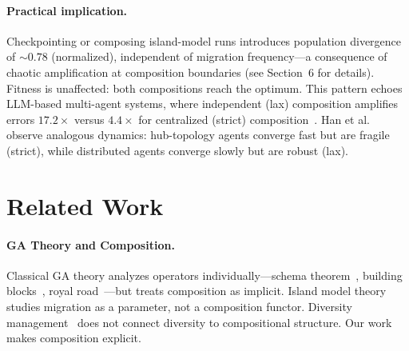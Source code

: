 \documentclass[sigconf]{acmart}
\begin{document}
\paragraph{Practical implication.}
Checkpointing or composing island-model runs introduces population divergence of ${\sim}0.78$ (normalized), independent of migration frequency---a consequence of chaotic amplification at composition boundaries (see Section~6 for details). Fitness is unaffected: both compositions reach the optimum. This pattern echoes LLM-based multi-agent systems, where independent (lax) composition amplifies errors $17.2\times$ versus $4.4\times$ for centralized (strict) composition~\cite{kim2025scaling}. Han et al.~\cite{han2026conformity} observe analogous dynamics: hub-topology agents converge fast but are fragile (strict), while distributed agents converge slowly but are robust (lax).

\section{Related Work}

\paragraph{GA Theory and Composition.}
Classical GA theory analyzes operators individually---schema theorem~\cite{holland1975adaptation}, building blocks~\cite{goldberg1989genetic, goldberg2002design}, royal road~\cite{mitchell1992royal}---but treats composition as implicit. Island model theory~\cite{whitley1999island, skolicki2005influence} studies migration as a parameter, not a composition functor. Diversity management~\cite{burke2004diversity, crepinsek2013exploration} does not connect diversity to compositional structure. Our work makes composition explicit.
\end{document}
